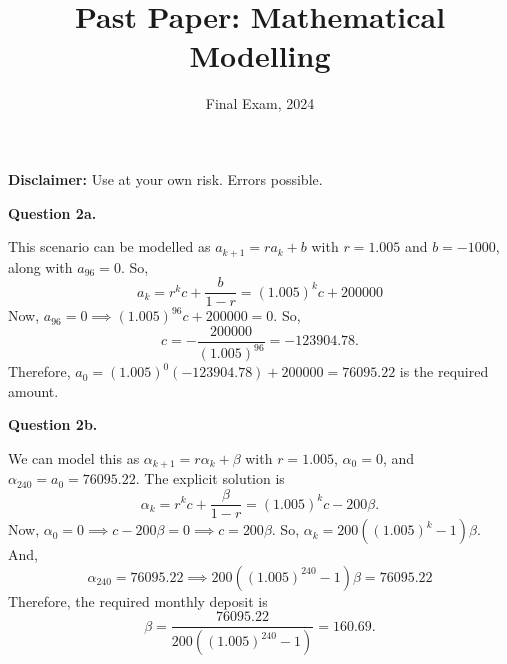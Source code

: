 \documentclass[11pt]{penrose}
\author{}
\title{Past Paper: Mathematical Modelling}
\subtitle{Final Exam, 2024}
\newenvironment{problem}[2][Question]{\textbf{#1 #2.}\par}{}
\newcommand{\warningtext}{\textbf{Disclaimer:} Use at your own risk. Errors possible.}
\begin{document}
\maketitle
\warningtext

\begin{problem}{2a}
    This scenario can be modelled as $a_{k+1} = ra_{k} + b$ with $r = 1.005$ and $b = -1000$, along with $a_{96} = 0$. So,
    \begin{equation*}
        a_{k} = r^{k} c + \frac{b}{1-r} = (1.005)^{k} c + 200 000
    \end{equation*}
    Now, $a_{96} = 0 \implies (1.005)^{96} c + 200 000 = 0$. So,
    \begin{equation*}
        c = - \frac{200 000}{(1.005)^{96}} = - 123 904.78.
    \end{equation*}
    Therefore, $a_{0} = (1.005)^{0} (- 123 904.78) + 200 000 = 76 095.22$ is the required amount.
\end{problem}

\begin{problem}{2b}
    We can model this as $\alpha_{k+1} = r\alpha_{k} + \beta$ with $r = 1.005$, $\alpha_{0} = 0$, and $\alpha_{240} = a_{0} = 76 095.22$. The explicit solution is
    \begin{equation*}
        \alpha_{k} = r^{k} c + \frac{\beta}{1-r} = (1.005)^{k} c - 200 \beta.
    \end{equation*}
    Now, $\alpha_{0} = 0 \implies c - 200\beta = 0 \implies c = 200\beta$. So, $\alpha_{k} = 200 ((1.005)^{k} - 1) \beta$. And,
    \begin{equation*}
        \alpha_{240} = 76 095.22
        \implies
        200 ((1.005)^{240} - 1) \beta = 76 095.22
    \end{equation*}
    Therefore, the required monthly deposit is
    \begin{equation*}
        \beta = \frac{76 095.22}{200 ((1.005)^{240} - 1)} = 160.69.
    \end{equation*}
\end{problem}
\end{document}
